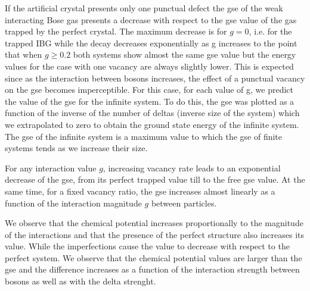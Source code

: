 \documentclass[twocolumn,showpacs,showkeys,preprintnumbers,superscriptaddress, pra, 10pt, aps]{revtex4-2}
\begin{document}
If the artificial crystal presents only one punctual defect the gse of the weak interacting Bose gas presents a decrease with respect to the gse value of the gas trapped by the perfect crystal. The maximum decrease is for $g=0$, i.e. for the trapped IBG while the decay decreases exponentially as g increases to the point that when $g \geq 0.2$ both systems show almost the same gse value but the energy values for the case with one vacancy are always slightly lower. This is expected since as the interaction between bosons increases, the effect of a punctual vacancy on the gse becomes imperceptible. For this case, for each value of g, we predict the value of the gse for the infinite system. To do this, the gse was plotted as a function of the inverse of the number of deltas (inverse size of the system) which we extrapolated to zero to obtain the ground state energy of the infinite system. The gse of the infinite system is a maximum value to which the gse of finite systems tends as we increase their size.





For any interaction value $g$, increasing vacancy rate leads to an exponential decrease of the gse, from its perfect trapped value till  to the free gse value.  At the same time, for a fixed vacancy ratio, the gse increases almost linearly as a function of the interaction magnitude $g$ between particles.


We observe that the chemical potential increases proportionally to the magnitude
of the interactions and that the presence of the perfect structure also increases its value. While
the imperfections cause the value to decrease with respect to the perfect system. We observe that the chemical potential values are larger than the gse and the difference increases as a function of the interaction strength between bosons as well as with the delta strenght. %
\end{document}
